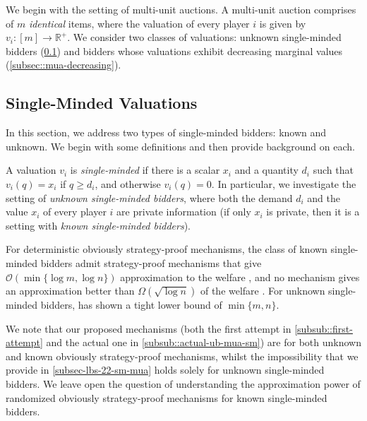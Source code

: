 We begin with the setting of multi-unit auctions. A multi-unit auction comprises of $m$ \emph{identical} items, where the valuation of every player $i$ is given by $v_i:[m]\to \mathbb R^{+}$. 
We consider two classes of valuations: unknown single-minded bidders (\cref{subsec::mua-sm}) and bidders whose valuations exhibit decreasing marginal values (\cref{subsec::mua-decreasing}). 




\subsection{Single-Minded Valuations} \label{subsec::mua-sm}
In this section, we address two types of single-minded bidders: known and unknown. We begin with some definitions and then provide background on each.  

A valuation $v_i$ is \emph{single-minded} if there is a scalar $x_i$ and a quantity $d_i$ such that $v_i(q)=x_i$
if $q\ge d_i$, and otherwise $v_i(q)=0$.
In particular, we investigate the setting of \emph{unknown single-minded bidders}, where both the demand $d_i$ and the value $x_i$ of every player $i$ are private information (if only $x_i$ is private, then it is a setting with \emph{known single-minded bidders}).


For deterministic obviously strategy-proof mechanisms, the class of  known single-minded bidders admit strategy-proof mechanisms that give ${\mathcal O}(\min\{\log m,\log n\})$ approximation to the welfare \cite{DGR14,CGS22}, and no mechanism  gives an approximation better than $\Omega(\sqrt{\log n})$ of the welfare \cite{FPV21}.  For unknown single-minded bidders, \cite{Ron24} has shown a tight lower bound of $\min\{m,n\}$. 

We note that our proposed mechanisms (both the first attempt in \cref{subsub::first-attempt} and the actual one in \cref{subsub::actual-ub-mua-sm}) are for both unknown and known obviously strategy-proof mechanisms, whilst the impossibility that we provide in \cref{subsec-lbs-22-sm-mua} holds solely for unknown single-minded bidders. We leave open the question of understanding the approximation power of randomized obviously strategy-proof mechanisms for known single-minded bidders.  




